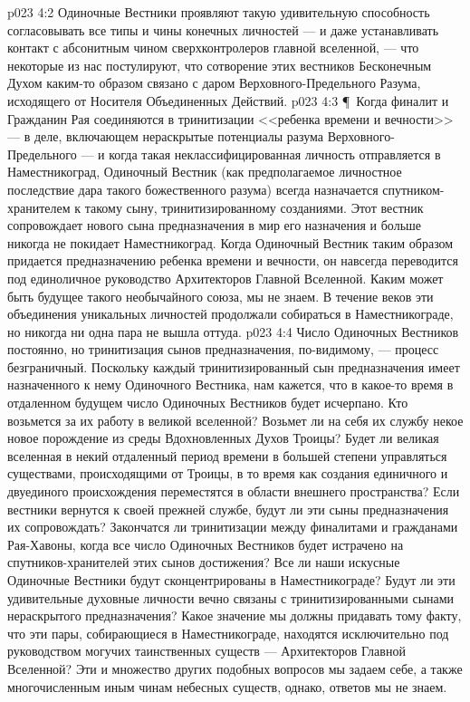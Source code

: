\vs p023 4:2 Одиночные Вестники проявляют такую удивительную способность согласовывать все типы и чины конечных личностей --- и даже устанавливать контакт с абсонитным чином сверхконтролеров главной вселенной, --- что некоторые из нас постулируют, что сотворение этих вестников Бесконечным Духом каким\hyp{}то образом связано с даром Верховного\hyp{}Предельного Разума, исходящего от Носителя Объединенных Действий.
\vs p023 4:3 \P\ Когда финалит и Гражданин Рая соединяются в тринитизации <<ребенка времени и вечности>> --- в деле, включающем нераскрытые потенциалы разума Верховного\hyp{}Предельного --- и когда такая неклассифицированная личность отправляется в Наместникоград, Одиночный Вестник (как предполагаемое личностное последствие дара такого божественного разума) всегда назначается спутником\hyp{}хранителем к такому сыну, тринитизированному созданиями. Этот вестник сопровождает нового сына предназначения в мир его назначения и больше никогда не покидает Наместникоград. Когда Одиночный Вестник таким образом придается предназначению ребенка времени и вечности, он навсегда переводится под единоличное руководство Архитекторов Главной Вселенной. Каким может быть будущее такого необычайного союза, мы не знаем. В течение веков эти объединения уникальных личностей продолжали собираться в Наместникограде, но никогда ни одна пара не вышла оттуда.
\vs p023 4:4 Число Одиночных Вестников постоянно, но тринитизация сынов предназначения, по\hyp{}видимому, --- процесс безграничный. Поскольку каждый тринитизированный сын предназначения имеет назначенного к нему Одиночного Вестника, нам кажется, что в какое\hyp{}то время в отдаленном будущем число Одиночных Вестников будет исчерпано. Кто возьмется за их работу в великой вселенной? Возьмет ли на себя их службу некое новое порождение из среды Вдохновленных Духов Троицы? Будет ли великая вселенная в некий отдаленный период времени в большей степени управляться существами, происходящими от Троицы, в то время как создания единичного и двуединого происхождения переместятся в области внешнего пространства? Если вестники вернутся к своей прежней службе, будут ли эти сыны предназначения их сопровождать? Закончатся ли тринитизации между финалитами и гражданами Рая\hyp{}Хавоны, когда все число Одиночных Вестников будет истрачено на спутников\hyp{}хранителей этих сынов достижения? Все ли наши искусные Одиночные Вестники будут сконцентрированы в Наместникограде? Будут ли эти удивительные духовные личности вечно связаны с тринитизированными сынами нераскрытого предназначения? Какое значение мы должны придавать тому факту, что эти пары, собирающиеся в Наместникограде, находятся исключительно под руководством могучих таинственных существ --- Архитекторов Главной Вселенной? Эти и множество других подобных вопросов мы задаем себе, а также многочисленным иным чинам небесных существ, однако, ответов мы не знаем.

